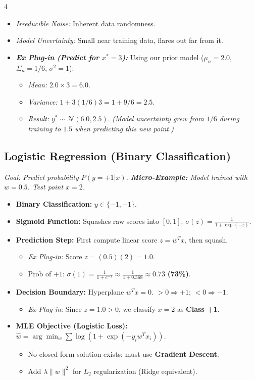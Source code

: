 \documentclass[9pt]{extarticle}
\begin{document}
\begin{multicols*}{4}
\begin{itemize}
    \item \textit{Irreducible Noise:} Inherent data randomness.
    \item \textit{Model Uncertainty:} Small near training data, flares out far from it.
    \item \textbf{\textit{Ex Plug-in (Predict for $x^* = 3$):}} Using our prior model ($\mu_n=2.0$, $\Sigma_n=1/6$, $\sigma^2=1$):
    \begin{itemize}
        \item \textit{Mean:} $2.0 \times 3 = \mathbf{6.0}$. 
        \item \textit{Variance:} $1 + 3(1/6)3 = 1 + 9/6 = \mathbf{2.5}$.
        \item \textit{Result:} $y^* \sim \mathcal{N}(6.0, 2.5)$. \textit{(Model uncertainty grew from $1/6$ during training to $1.5$ when predicting this new point.)}
    \end{itemize}
\end{itemize}

\subsection*{Logistic Regression (Binary Classification)}
\textit{Goal: Predict probability $P(y=+1|x)$. \textbf{Micro-Example:} Model trained with $w=0.5$. Test point $x=2$.}
\begin{itemize}
    \item \textbf{Binary Classification:} $y \in \{-1, +1\}$.
    \item \textbf{Sigmoid Function:} Squashes raw scores into $[0,1]$. $\sigma(z) = \frac{1}{1 + \exp(-z)}$.
    \item \textbf{Prediction Step:} First compute linear score $z=w^T x$, then squash.
    \begin{itemize}
        \item \textit{Ex Plug-in:} Score $z = (0.5)(2) = \mathbf{1.0}$.
        \item Prob of $+1$: $\sigma(1) = \frac{1}{1+e^{-1}} \approx \frac{1}{1+0.368} \approx \mathbf{0.73}$ \textbf{(73\%)}.
    \end{itemize}
    \item \textbf{Decision Boundary:} Hyperplane $w^T x = 0$. $>0 \Rightarrow +1$; $<0 \Rightarrow -1$.
    \begin{itemize}
        \item \textit{Ex Plug-in:} Since $z=1.0 > 0$, we classify $x=2$ as \textbf{Class +1}.
    \end{itemize}
    \item \textbf{MLE Objective (Logistic Loss):} $\hat{w} = \arg \min_w \sum \log(1 + \exp(-y_i w^T x_i))$.
    \begin{itemize}
        \item No closed-form solution exists; must use \textbf{Gradient Descent}.
        \item Add $\lambda\|w\|^2$ for $L_2$ regularization (Ridge equivalent).
    \end{itemize}
\end{itemize}


\end{multicols*}
\end{document}
